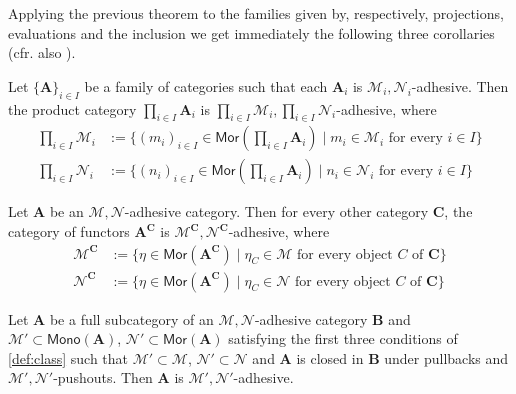 \documentclass[runningheads,envcountsect]{lmcs}
\newcommand{\catname}[1]{\mathbf{#1}}
\newcommand{\arr}[1]{\mathsf{Mor}(\catname{#1})}
\newcommand{\mono}[1]{\mathsf{Mono}(\catname{#1})}
\theoremstyle{plain}
\theoremstyle{definition}
\begin{document}
Applying the previous theorem to the families given by, respectively, projections, evaluations and the inclusion we get immediately the following three corollaries (cfr. also \cite[Thm.~4.15]{ehrig2006fundamentals}). 
\begin{cor}\label{cor:varie1}
	Let $\{\catname{A}\}_{i\in I}$ be a family of categories such that each $\catname{A}_i$ is $\mathcal{M}_i,\mathcal{N}_i$-adhesive. Then the product category $\prod_{i\in I}\catname{A}_i$ is $\prod_{i\in I}\mathcal{M}_i,\prod_{i\in I}\mathcal{N}_i$-adhesive, where
		\begin{align*}
		\prod_{i\in I}\mathcal{M}_i&:=\{(m_i)_{i\in I}\in \mathsf{Mor}(\prod_{i\in I}\catname{A}_i)\mid m_i \in \mathcal{M}_i \text{ for every } i \in I\}\\
		\prod_{i\in I}\mathcal{N}_i&:=\{(n_i)_{i\in I}\in \mathsf{Mor}(\prod_{i\in I}\catname{A}_i)\mid n_i \in \mathcal{N}_i \text{ for every } i \in I\}
		\end{align*}
\end{cor}
\begin{cor}\label{cor:varie2}
 Let $\catname{A}$ be an $\mathcal{M},\mathcal{N}$-adhesive category. Then for every other category $\catname{C}$, the category of functors $\catname{A}^{\catname{C}}$ is $\mathcal{M}^{\catname{C}},\mathcal{N}^{\catname{C}}$-adhesive, where
		\begin{align*}
		\mathcal{M}^{\catname{C}}&:=\{\eta \in \arr{A^C} \mid \eta_C \in \mathcal{M} \text{ for every object } C \text{ of } \catname{C} \}\\
		\mathcal{N}^{\catname{C}}&:=\{\eta \in \arr{A^C} \mid \eta_C \in \mathcal{N} \text{ for every object } C \text{ of } \catname{C} \}
		\end{align*} 
\end{cor}
		

\begin{cor}\label{cor:varie3}
	Let $\catname{A}$ be a full subcategory of an $\mathcal{M}, \mathcal{N}$-adhesive category $\catname{B}$ and
	$\mathcal{M}'\subset \mono{A}$, $\mathcal{N}'\subset \arr{A}$ satisfying the first three conditions of \cref{def:class} such that $\mathcal{M}'\subset \mathcal{M}$, $\mathcal{N}'\subset \mathcal{N}$ and $\catname{A}$ is closed in $\catname{B}$ under pullbacks and $\mathcal{M'}, \mathcal{N'}$-pushouts. Then $\catname{A}$ is $\mathcal{M}', \mathcal{N'}$-adhesive.
\end{cor}
\end{document}
